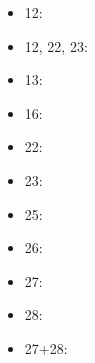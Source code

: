 \documentclass{ifacconf}
\begin{document}
\begin{itemize}
  \item 12: \cite{bi:12}
  \item 12, 22, 23: \cite{bi:12,bi:22,bi:23}
  \item 13: \cite{bi:13}
  \item 16: \cite{bi:16}
  \item 22: \cite{bi:22}
  \item 23: \cite{bi:23}
  \item 25: \cite{bi:25}
  \item 26: \cite{bi:26}
  \item 27: \cite{bi:27}
  \item 28: \cite{bi:28}
  \item 27+28: \cite{bi:27,bi:28}
\end{itemize}
  
\end{document}
